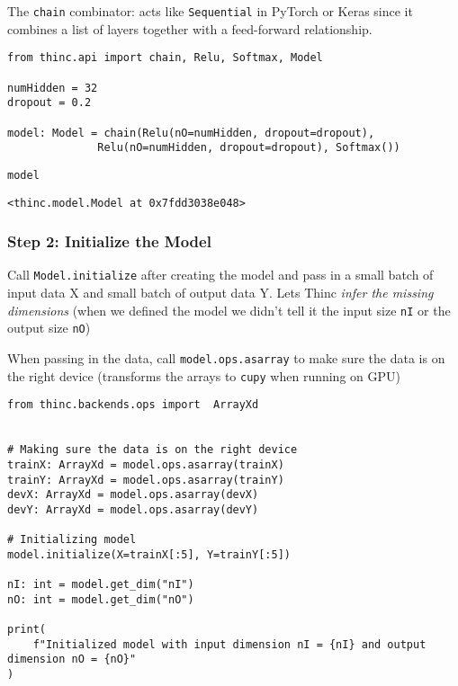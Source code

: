 \documentclass[
]{article}
\begin{document}
The \texttt{chain} combinator: acts like
\texttt{Sequential} in PyTorch or Keras since it combines
a list of layers together with a feed-forward relationship.

\begin{verbatim}
from thinc.api import chain, Relu, Softmax, Model

numHidden = 32
dropout = 0.2

model: Model = chain(Relu(nO=numHidden, dropout=dropout),
              Relu(nO=numHidden, dropout=dropout), Softmax())
\end{verbatim}

\begin{verbatim}
model
\end{verbatim}

\begin{verbatim}
<thinc.model.Model at 0x7fdd3038e048>
\end{verbatim}

\hypertarget{step-2-initialize-the-model}{%
\subsubsection{Step 2: Initialize the
Model}\label{step-2-initialize-the-model}}

Call \texttt{Model.initialize} after creating the model
and pass in a small batch of input data X and small batch of output data
Y. Lets Thinc \emph{infer the missing dimensions} (when we defined the
model we didn't tell it the input size \texttt{nI} or the
output size \texttt{nO})

When passing in the data, call \texttt{model.ops.asarray}
to make sure the data is on the right device (transforms the arrays to
\texttt{cupy} when running on GPU)

\begin{verbatim}
from thinc.backends.ops import  ArrayXd


# Making sure the data is on the right device
trainX: ArrayXd = model.ops.asarray(trainX)
trainY: ArrayXd = model.ops.asarray(trainY)
devX: ArrayXd = model.ops.asarray(devX)
devY: ArrayXd = model.ops.asarray(devY)

# Initializing model
model.initialize(X=trainX[:5], Y=trainY[:5])

nI: int = model.get_dim("nI")
nO: int = model.get_dim("nO")

print(
    f"Initialized model with input dimension nI = {nI} and output dimension nO = {nO}"
)
\end{verbatim}
\end{document}
